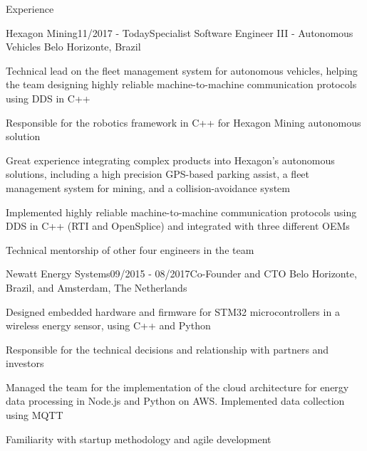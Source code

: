\documentclass[14pt, a4paper]{resume} %
\begin{document}
\begin{rSection}{Experience}


\begin{rSubsection}{Hexagon Mining}{11/2017 - Today}{\normalfont Specialist Software Engineer III - Autonomous Vehicles}{ \normalfont Belo Horizonte, Brazil}
	\item Technical lead on the fleet management system for autonomous vehicles, helping the team designing highly reliable machine-to-machine communication protocols using DDS in C++
	\item Responsible for the robotics framework in C++ for Hexagon Mining autonomous solution
	\item Great experience integrating complex products into Hexagon's autonomous solutions, including a high precision GPS-based parking assist, a fleet management system for mining, and a collision-avoidance system
	\item Implemented highly reliable machine-to-machine communication protocols using DDS in C++ (RTI and OpenSplice) and integrated with three different OEMs
	\item Technical mentorship of other four engineers in the team

\end{rSubsection}



\begin{rSubsection}{Newatt Energy Systems}{09/2015 - 08/2017}{\normalfont Co-Founder and CTO}{ \normalfont Belo Horizonte, Brazil, and Amsterdam, The Netherlands}
 	\item Designed embedded hardware and firmware for STM32 microcontrollers in a wireless energy sensor, using C++ and Python
	\item Responsible for the technical decisions and relationship with partners and investors
	\item Managed the team for the implementation of the cloud architecture for energy data processing in Node.js and Python on AWS. Implemented data collection using MQTT
	\item Familiarity with startup methodology and agile development
\end{rSubsection}


\end{rSection}
\end{document}
